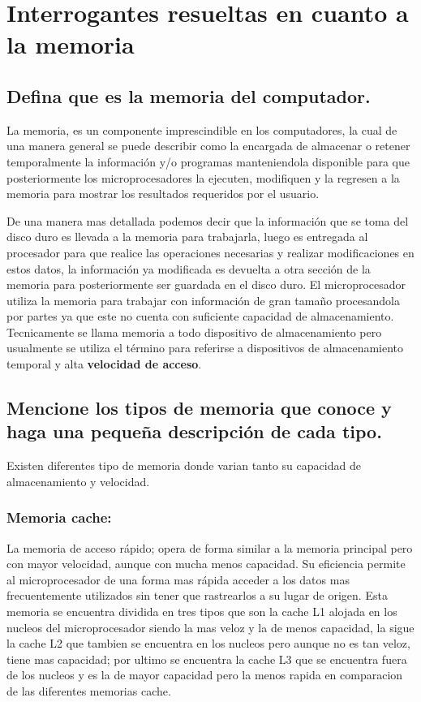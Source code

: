 \documentclass{article}
\begin{document}
\section{Interrogantes resueltas en cuanto a la memoria} \label{contenido}

\subsection{\textbf{Defina que es la memoria del computador.}}
La memoria, es un componente imprescindible en los computadores, la cual de una manera general se puede describir como la encargada de almacenar o retener temporalmente la información y/o programas manteniendola disponible para que posteriormente los microprocesadores la ejecuten, modifiquen y la regresen a la memoria para mostrar los resultados requeridos por el usuario. \cite{augusto} \cite{ecured}

De una manera mas detallada podemos decir que la información que se toma del disco duro es llevada a la memoria para trabajarla, luego es entregada al procesador para que realice las operaciones necesarias y realizar modificaciones en estos datos, la información ya modificada es devuelta a otra sección de la memoria para posteriormente ser guardada en el disco duro.
El microprocesador utiliza la memoria para trabajar con información de gran tamaño procesandola por partes ya que este no cuenta con suficiente capacidad de almacenamiento.
Tecnicamente se llama memoria a todo dispositivo de almacenamiento pero usualmente se utiliza el término para referirse a dispositivos de almacenamiento temporal y alta \textbf{velocidad de acceso}. \cite{augusto}
    
\subsection{\textbf{Mencione los tipos de memoria que conoce y haga una pequeña descripción de cada tipo.}}
Existen diferentes tipo de memoria donde varian tanto su capacidad de almacenamiento y velocidad.\\

\subsubsection{\textbf{Memoria cache:}}
La memoria de acceso rápido; opera de forma similar a la memoria principal pero con mayor velocidad, aunque con mucha menos capacidad. Su eficiencia permite al microprocesador de una forma mas rápida acceder a los datos mas frecuentemente utilizados sin tener que rastrearlos a su lugar de origen. \cite{concepto} Esta memoria se encuentra dividida en tres tipos que son la cache L1 alojada en los nucleos del microprocesador siendo la mas veloz y la de menos capacidad, la sigue la cache L2 que tambien se encuentra en los nucleos pero aunque no es tan veloz, tiene mas capacidad; por ultimo se encuentra la cache L3 que se encuentra fuera de los nucleos y es la de mayor capacidad pero la menos rapida en comparacion de las diferentes memorias cache. \cite{augusto}
\end{document}
